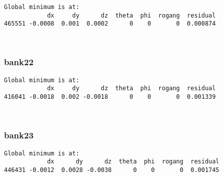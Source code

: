 \documentclass[11pt]{article}
\begin{document}
    \begin{Verbatim}[commandchars=\\\{\}]
Global minimum is at:
            dx     dy      dz  theta  phi  rogang  residual
465551 -0.0008  0.001  0.0002      0    0       0  0.000874
    \end{Verbatim}

    \begin{center}
    \end{center}
    { \hspace*{\fill} \\}
    
    \hypertarget{bank22}{%
\subsubsection{bank22}\label{bank22}}

    \begin{Verbatim}[commandchars=\\\{\}]
Global minimum is at:
            dx     dy      dz  theta  phi  rogang  residual
416041 -0.0018  0.002 -0.0018      0    0       0  0.001339
    \end{Verbatim}

    \begin{center}
    \end{center}
    { \hspace*{\fill} \\}
    
    \hypertarget{bank23}{%
\subsubsection{bank23}\label{bank23}}

    \begin{Verbatim}[commandchars=\\\{\}]
Global minimum is at:
            dx      dy      dz  theta  phi  rogang  residual
446431 -0.0012  0.0028 -0.0038      0    0       0  0.001745
    \end{Verbatim}

    \begin{center}
    \end{center}
    { \hspace*{\fill} \\}
    
\end{document}
